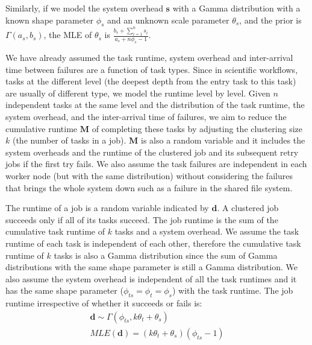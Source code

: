 Similarly, if we model the system overhead $\bm s$ with a Gamma distribution with a known shape parameter $\phi_{s}$ and an unknown scale parameter $\theta_s$, and the prior is $\Gamma(a_s, b_s)$, the MLE of $\theta_s$ is $\displaystyle\frac{b_s+\displaystyle\sum_{i=1}^n{s_i}}{a_s+n\phi_s-1}$.

We have already assumed the task runtime, system overhead and inter-arrival time between failures are a function of task types. Since in scientific workflows, tasks at the different level (the deepest depth from the entry task to this task) are usually of different type, we model the runtime level by level. Given $n$ independent tasks at the same level and the distribution of the task runtime, the system overhead, and the inter-arrival time of failures, we aim to reduce the cumulative runtime $\bm M$ of completing these tasks by adjusting the clustering size $k$ (the number of tasks in a job). 
$\bm M$ is also a random variable and it includes the system overheads and the runtime of the clustered job and its subsequent retry jobs if the first try fails. We also assume the task failures are independent in each worker node (but with the same distribution) without considering the failures that brings the whole system down such as a failure in the shared file system. 

The runtime of a job is a random variable indicated by $\bm d$. A clustered job succeeds only if all of its tasks succeed. The job runtime is the sum of the cumulative task runtime of $k$ tasks and a system overhead. We assume the task runtime of each task is independent of each other, therefore the cumulative task runtime of $k$ tasks is also a Gamma distribution since the sum of Gamma distributions with the same shape parameter is still a Gamma distribution. We also assume the system overhead is independent of all the task runtimes and it has the same shape parameter ($\phi_{ts}=\phi_{t}=\phi_{s}$) with the task runtime. 
The job runtime irrespective of whether it succeeds or fails is:
\begin{eqnarray}
\displaystyle
\bm{d}\sim\Gamma(\phi_{ts}, k\theta_t+\theta_s)\\
MLE(\bm{d})=\displaystyle{(k\theta_t+\theta_s) }{(\phi_{ts}-1)}
\label{eq:N}
\end{eqnarray}

